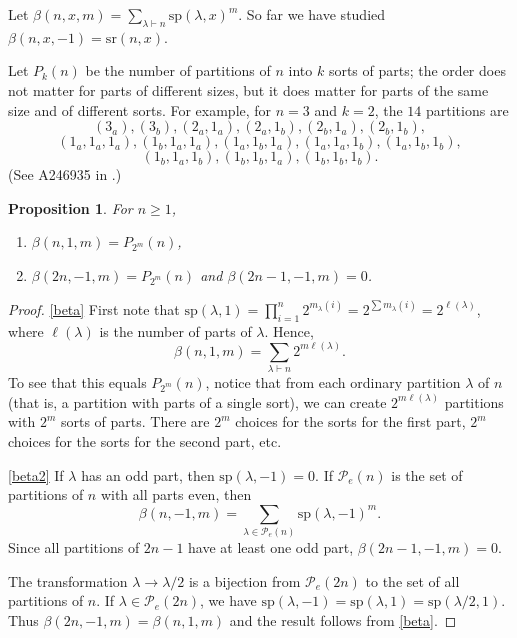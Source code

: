 \documentclass[reqno]{amsart}
\def\sp{\mathrm{sp}}
\def\sr{\mathrm{sr}}
\newtheorem{proposition}[theorem]{Proposition}
\theoremstyle{definition}
\begin{document}
Let $\beta(n,x,m)=\sum_{\lambda \vdash n} \sp(\lambda, x)^m$. So far we have studied $\beta(n,x,-1)=\sr(n,x)$.

Let $P_k(n)$ be the number of partitions of $n$ into $k$ sorts of parts; the order does not matter for parts of different sizes, but it does matter for  parts of the same size and  of different sorts. For example, for $n=3$ and $k=2$, the $14$ partitions are $$(3_a),(3_b),(2_a,1_a),(2_a,1_b), (2_b,1_a),(2_b,1_b),$$
$$(1_a,1_a,1_a), (1_b,1_a,1_a),(1_a,1_b,1_a),(1_a,1_a,1_b), (1_a,1_b,1_b),$$
$$(1_b,1_a,1_b),(1_b,1_b,1_a), (1_b,1_b,1_b).$$ (See A246935 in  \cite{OEIS}.) 

\begin{proposition}
For $n \geq 1$, 
\begin{enumerate}[label=(\alph*)]
\item \label{beta} $\beta(n,1,m) = P_{2^m}(n)$,
\item \label{beta2} $\beta(2n,-1,m) = P_{2^m}(n)$ and $\beta(2n-1,-1,m) = 0$.
\end{enumerate}
\end{proposition}

\begin{proof} \ref{beta} First note that $\sp(\lambda,1)=\prod_{i=1}^n 2^{m_\lambda(i)}=2^{\sum m_\lambda(i)}=2^{\ell(\lambda)}$, where $\ell(\lambda)$ is the number of parts of $\lambda$. Hence, $$\beta(n,1,m)=\sum_{\lambda \vdash n}2^{m\ell(\lambda)}.$$ To see that this equals $P_{2^m}(n)$, notice that from each ordinary partition $\lambda$ of $n$ (that is, a partition with parts of a single sort), we can create $2^{m\ell(\lambda)}$ partitions with $2^m$ sorts of parts. There are $2^m$ choices for the sorts for the first part, $2^m$ choices for the sorts for the second part, etc.  

\ref{beta2} If $\lambda$ has an odd part, then $\sp(\lambda, -1)=0$. If $\mathcal P_e(n)$ is the set of partitions of $n$ with all parts even, then  $$ \beta(n,-1, m)=\sum_{\lambda\in \mathcal P_e(n)}\sp(\lambda, -1)^m.$$ Since all partitions of $2n-1$ have at least one odd part, $\beta(2n-1,-1,m) = 0$.

The transformation $\lambda\to \lambda/2$ is a bijection from $\mathcal P_e(2n)$  to the set of all partitions of $n$. If $\lambda\in \mathcal P_e(2n)$, we have $\sp(\lambda, -1)=\sp(\lambda,1)=\sp(\lambda/2, 1).$ Thus $\beta(2n,-1,m)=\beta(n,1,m)$ and the result follows from \ref{beta}.
\end{proof}
\end{document}
